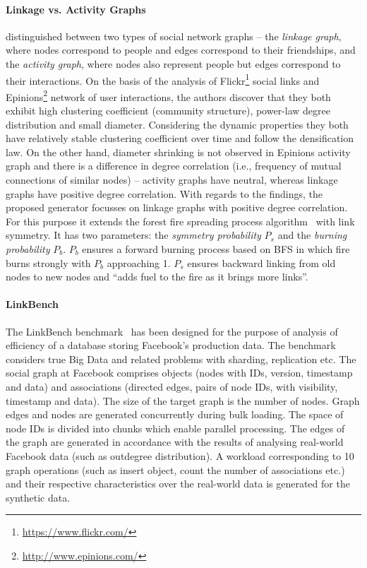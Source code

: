 \paragraph{Linkage vs. Activity Graphs}
\cite{Yao2011} distinguished between two types of social network graphs -- the
\emph{linkage graph}, where nodes correspond to people and edges correspond to their
friendships, and the \emph{activity graph}, where nodes also represent people
but edges correspond to their interactions. On the basis of the analysis of
Flickr\footnote{\url{https://www.flickr.com/}} social links and
Epinions\footnote{\url{http://www.epinions.com/}} network of user interactions,
the authors discover that they both exhibit high clustering coefficient
(community structure), power-law degree distribution and small diameter.
Considering the dynamic properties they both have relatively stable clustering
coefficient over time and follow the densification law. On the other hand,
diameter shrinking is not observed in Epinions activity graph and there is a
difference in degree correlation (i.e., frequency of mutual connections of
similar nodes) -- activity graphs have neutral, whereas linkage graphs have positive degree correlation. With regards to the findings, the
proposed generator focusses on linkage graphs with positive degree correlation.
For this purpose it extends the forest fire spreading process
algorithm~\cite{Leskovec:2005:GOT:1081870.1081893} with link symmetry. It has
two parameters: the \emph{symmetry
probability} $P_s$ and the \emph{burning probability} $P_b$. $P_b$ ensures a forward burning process based on BFS in which
fire burns strongly with $P_b$ approaching 1.  $P_s$ ensures backward linking
from old nodes to new nodes and ``adds fuel to the fire as it brings more
links''. %


\paragraph{LinkBench} The LinkBench
benchmark~\cite{Armstrong:2013:LDB:2463676.2465296} has been designed for the
purpose of analysis of efficiency of a database storing Facebook's production
data. The benchmark considers true Big Data and related problems with sharding,
replication etc. The social graph at Facebook comprises objects (nodes with IDs,
version, timestamp and data) and associations (directed edges, pairs of node
IDs, with visibility, timestamp and data). The size of the target graph is the
number of nodes. Graph edges and nodes are generated concurrently during bulk
loading. The space of node IDs is divided into chunks which enable parallel
processing. The edges of the graph are generated in accordance with the results
of analysing  real-world Facebook data (such as outdegree distribution). A
workload corresponding to 10 graph operations (such as insert object, count the
number of associations etc.) and their respective characteristics over the
real-world data is generated for the synthetic data.

